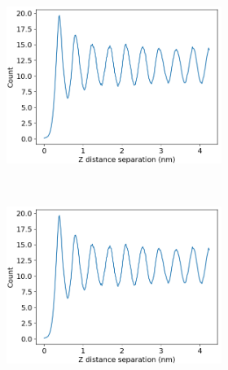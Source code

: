 \documentclass{article}
\begin{document}
\begin{figure}[ht]

\begin{subfigure}{.45\linewidth}
	\centering
	\begin{subfigure}{\linewidth}
		\centering
		\includegraphics[width=\textwidth]{zdf_5_layered.png}
		\caption{}~\label{fig:raw_waxs}	
	\end{subfigure}
	\begin{subfigure}{\linewidth}
		\centering
		\includegraphics[width=\textwidth]{zdf_5_layered.png}
		\caption{}~\label{fig:rz_offset}
	\end{subfigure}
        \begin{subfigure}{\linewidth}
                \centering

\end{subfigure}
\end{subfigure}
\end{figure}
\end{document}
